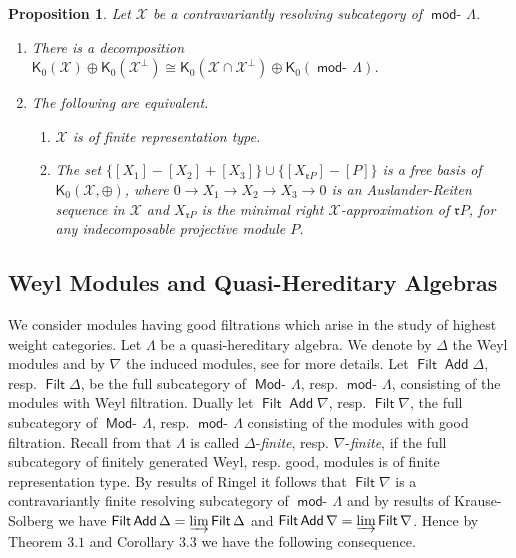 \documentclass[oneside, a4paper,reqno]{amsart}
\numberwithin{equation}{section}
\newtheorem{prop}[thm]{Proposition}
\theoremstyle{definition}
\begin{document}
\begin{prop} Let ${\mathcal X}$ be a contravariantly resolving subcategory of $\operatorname*{\mathsf{mod}-\!}\Lambda$.
\begin{enumerate}
\item There is a decomposition $\mathsf{K}_{0}({\mathcal X}) \oplus
\mathsf{K}_{0}({\mathcal X}^{\bot}) \cong \mathsf{K}_{0}({\mathcal X}\cap {\mathcal X}^{\bot})
\oplus \mathsf{K}_{0}(\operatorname*{\mathsf{mod}-\!}\Lambda)$.
\item The following are equivalent.
\begin{enumerate}
\item ${\mathcal X}$ is of finite representation type.
\item The set $\big\{[X_{1}]-[X_{2}]+[X_{3}]\big\} \cup
\big\{[X_{\mathfrak{r}P}]-[P] \big\}$ is a free basis of
$\mathsf{K}_{0}({\mathcal X},\oplus)$, where $0 {\longrightarrow} X_{1} {\longrightarrow} X_{2} {\longrightarrow}
X_{3} {\longrightarrow} 0$ is an Auslander-Reiten sequence in ${\mathcal X}$ and
$X_{\mathfrak{r}P}$ is the minimal right ${\mathcal X}$-approximation of
$\mathfrak{r}P$, for any indecomposable projective module $P$.
\end{enumerate}
\end{enumerate}
\end{prop}

\subsection{Weyl Modules and Quasi-Hereditary Algebras} We consider modules having good filtrations
which arise in the study of highest weight categories. Let $\Lambda$
be a quasi-hereditary algebra. We denote by $\Delta$ the Weyl
modules and by $\nabla$ the induced modules, see \cite{Ringel:good}
for more details. Let $\operatorname*{\mathsf{Filt}} \operatorname*{\mathsf{Add}} \Delta$, resp. $\operatorname*{\mathsf{Filt}} \Delta$, be
the full subcategory of $\operatorname*{\mathsf{Mod}-\!}\Lambda$, resp. $\operatorname*{\mathsf{mod}-\!}\Lambda$,
consisting of the modules with Weyl filtration. Dually let $\operatorname*{\mathsf{Filt}}
\operatorname*{\mathsf{Add}} \nabla$, resp. $\operatorname*{\mathsf{Filt}} \nabla$, the full subcategory of
$\operatorname*{\mathsf{Mod}-\!}\Lambda$, resp. $\operatorname*{\mathsf{mod}-\!}\Lambda$ consisting of the modules with
good filtration. Recall from \cite{Ringel:quasi} that $\Lambda$ is
called $\Delta$-{\em finite}, resp. $\nabla$-{\em finite}, if the
full subcategory of finitely generated Weyl, resp. good, modules is
of finite representation type.  By results of Ringel
\cite{Ringel:good} it follows that $\operatorname*{\mathsf{Filt}}\nabla$ is a
contravariantly finite resolving subcategory of $\operatorname*{\mathsf{mod}-\!}\Lambda$ and
by results of Krause-Solberg \cite{KS:appl} we have $\operatorname*{\mathsf{Filt}}\operatorname*{\mathsf{Add}}
\Delta = \operatorname*{\varinjlim} \operatorname*{\mathsf{Filt}}\Delta$ and $\operatorname*{\mathsf{Filt}}\operatorname*{\mathsf{Add}} \nabla = \operatorname*{\varinjlim}
\operatorname*{\mathsf{Filt}}\nabla$. Hence by Theorem $3.1$ and Corollary $3.3$ we have the
following consequence.
\end{document}

